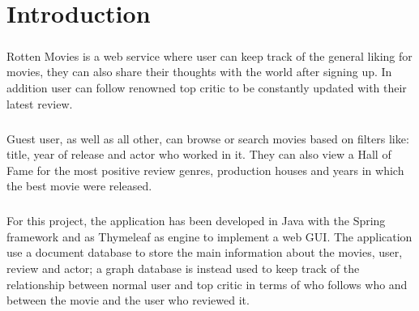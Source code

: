 % 


%

\chapter{Introduction}
\justifying
\paragraph{}
Rotten Movies is a web service where user can keep track of the general liking for movies, they can also share their thoughts with the world after signing up. In addition user can follow renowned top critic to be constantly updated with their latest review.
\paragraph{}
Guest user, as well as all other, can browse or search movies based on filters like: title, year of release and actor who worked in it. They can also view a Hall of Fame for the most positive review genres, production houses and years in which the best movie were released.
\paragraph{}
For this project, the application has been developed in Java with the Spring framework and as Thymeleaf as engine to implement a web GUI. The application use a document database to store the main information about the movies, user, review and actor; a graph database is instead used to keep track of the relationship between normal user and top critic in terms of who follows who and between the movie and the user who reviewed it.
%

